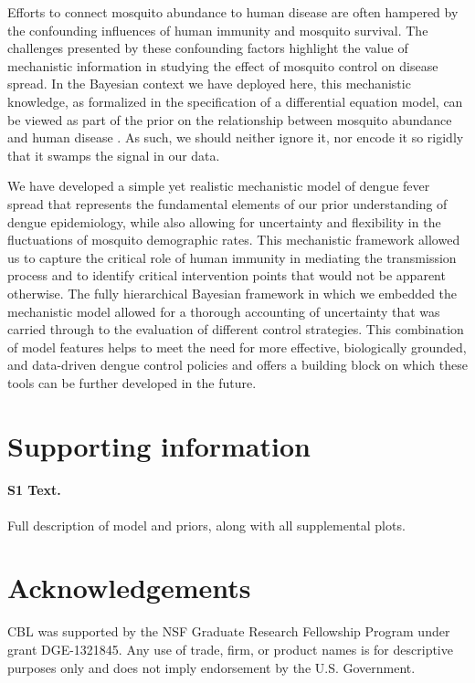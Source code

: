 \documentclass[10pt,letterpaper]{article}
\begin{document}
Efforts to connect mosquito abundance to human disease are often hampered by the confounding influences of human immunity and mosquito survival.
The challenges presented by these confounding factors highlight the value of mechanistic information in studying the effect of mosquito control on disease spread.
In the Bayesian context we have deployed here, this mechanistic knowledge, as formalized in the specification of a differential equation model, can be viewed as part of the prior on the relationship between mosquito abundance and human disease \cite{Ellner1998, Wikle2010}.
As such, we should neither ignore it, nor encode it so rigidly that it swamps the signal in our data.

We have developed a simple yet realistic mechanistic model of dengue fever spread that represents the fundamental elements of our prior understanding of dengue epidemiology, while also allowing for uncertainty and flexibility in the fluctuations of mosquito demographic rates.
This mechanistic framework allowed us to capture the critical role of human immunity in mediating the transmission process and to identify critical intervention points that would not be apparent otherwise.
The fully hierarchical Bayesian framework in which we embedded the mechanistic model allowed for a thorough accounting of uncertainty that was carried through to the evaluation of different control strategies.
This combination of model features helps to meet the need for more effective, biologically grounded, and data-driven dengue control policies and offers a building block on which these tools can be further developed in the future.

\section*{Supporting information}

\paragraph*{S1 Text.}
\label{S1}
{Full description of model and priors, along with all supplemental plots.}

\section*{Acknowledgements}

CBL was supported by the NSF Graduate Research Fellowship Program under grant DGE-1321845.
Any use of trade, firm, or product names is for descriptive purposes only and does not imply endorsement by the U.S. Government.

\nolinenumbers

%
%
% 



\end{document}
